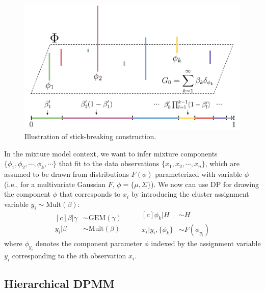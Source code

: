 \documentclass{article}
\begin{document}
\begin{figure}[h]
    \centering
    \includegraphics[trim=0cm 0cm 0cm 1cm, clip=true,width=0.8\linewidth]{figs/stick-breaking.pdf}
    \caption{Illustration of stick-breaking construction.}
    \label{fig:stick_breaking}
\end{figure}

In the mixture model context, we want to infer mixture components $\{\phi_{1}, \phi_{2}, \cdots, \phi_{k}, \cdots\}$ that fit to the data observations $\{x_{1}, x_{2}, \cdots, x_{n}\}$, which are assumed to be drawn from distributions $F(\phi)$ parameterized with variable $\phi$ (i.e., for a multivariate Gaussian $F$, $\phi = \{\mu, \Sigma\}$).
We now can use DP for drawing the component $\phi$ that corresponds to $x_{i}$ by introducing the cluster assignment variable $y_{i}\sim\text{Mult}(\beta)$:
\begin{equation}\label{eq:dpmm}
\begin{aligned}[c]
    \beta|\gamma &\sim \text{GEM}(\gamma) \\
    y_{i}|\beta &\sim \text{Mult}(\beta)
\end{aligned}
\qquad
\begin{aligned}[c]
    \phi_{k}|H &\sim H \\
    x_{i}|y_{i},\{\phi_{k}\} &\sim F(\phi_{y_{i}}) 
\end{aligned}
\end{equation}
where $\phi_{y_{i}}$ denotes the component parameter $\phi$ indexed by the assignment variable $y_{i}$ corresponding to the $i$th observation $x_{i}$.

\subsection{Hierarchical DPMM}\label{sec:hdpgmm:hdpmm}
\end{document}
